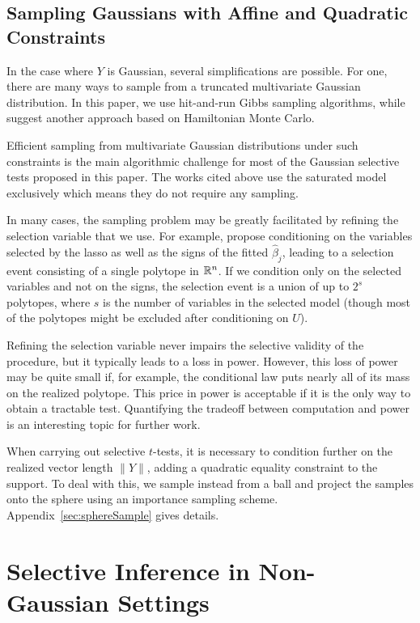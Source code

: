 \documentclass{article}
\theoremstyle{definition}
\begin{document}
\subsection{Sampling Gaussians with Affine and Quadratic Constraints}\label{sec:affine}


In the case where $Y$ is Gaussian, several simplifications are possible. For one, there are many ways to sample from a truncated multivariate Gaussian distribution. In this paper, we use hit-and-run Gibbs sampling algorithms, while \citet{pakman2014exact} suggest another approach based on Hamiltonian Monte Carlo.

Efficient sampling from multivariate Gaussian distributions under such constraints is the main algorithmic challenge for most of the Gaussian selective tests proposed in this paper. The works cited above use the saturated model exclusively which means they do not require any sampling.

In many cases, the sampling problem may be greatly facilitated by refining the selection variable that we use. For example, \citet{lee2016exact} propose conditioning on the variables selected by the lasso as well as the signs of the fitted $\hat\beta_j$, leading to a selection event consisting of a single polytope in $\mathbb{R}^n$. If we condition only on the selected variables and not on the signs, the selection event is a union of up to $2^s$ polytopes, where $s$ is the number of variables in the selected model (though most of the polytopes might be excluded after conditioning on $U$).

Refining the selection variable never impairs the selective validity of the procedure, but it typically leads to a loss in power. However, this loss of power may be quite small if, for example, the conditional law puts nearly all of its mass on the realized polytope. This price in power is acceptable if it is the only way to obtain a tractable test. Quantifying the tradeoff between computation and power is an interesting topic for further work.

When carrying out selective $t$-tests, it is necessary to condition further on the realized vector length $\|Y\|$, adding a quadratic equality constraint to the support. To deal with this, we sample instead from a ball and project the samples onto the sphere using an importance sampling scheme. Appendix~\ref{sec:sphereSample} gives details.


\section{Selective Inference in Non-Gaussian Settings}\label{sec:examples}
\end{document}
